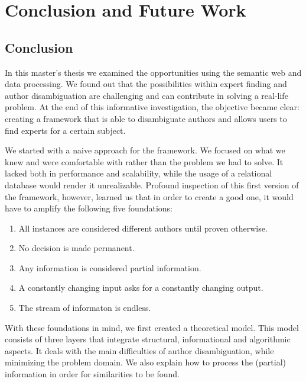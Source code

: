 \chapter{Conclusion and Future Work}


\section{Conclusion}

In this master's thesis we examined the opportunities using the semantic web and data processing. We found out that the possibilities within expert finding and author disambiguation are challenging and can contribute in solving a real-life problem. At the end of this informative investigation, the objective became clear: creating a framework that is able to disambiguate authors and allows users to find experts for a certain subject.


We started with a naive approach for the framework. We focused on what we knew and were comfortable with rather than the problem we had to solve. It lacked both in performance and scalability, while the usage of a relational database would render it unrealizable. Profound inspection of this first version of the framework, however, learned us that in order to create a good one, it would have to amplify the following five foundations:

\begin{enumerate}
	\item All instances are considered different authors until proven otherwise.
	\item No decision is made permanent.
	\item Any information is considered partial information.
	\item A constantly changing input asks for a constantly changing output.
	\item The stream of informaton is endless.
\end{enumerate}


With these foundations in mind, we first created a theoretical model. This model consists of three layers that integrate structural, informational and algorithmic aspects. It deals with the main difficulties of author disambiguation, while minimizing the problem domain. We also explain how to process the (partial) information in order for similarities to be found. 

